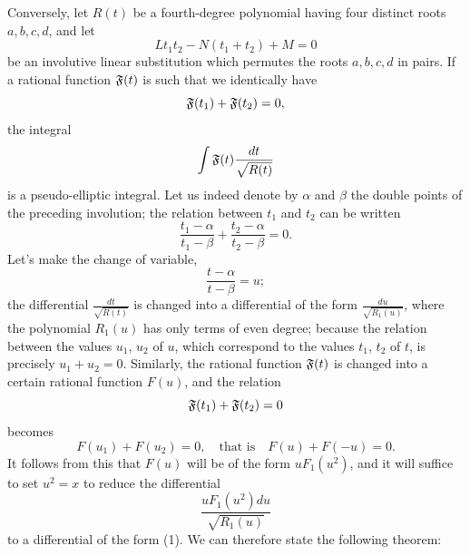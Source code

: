 \documentclass[11pt]{article}
\begin{document}
Conversely, let $R(t)$ be a fourth-degree polynomial having four distinct roots $a, b, c, d$, and let
\begin{equation*}
Lt_{1}t_{2}-N(t_{1}+t_{2})+M=0
\end{equation*}
be an involutive linear substitution which permutes the roots $a, b, c, d$ in pairs. If a rational function $\mathfrak{F}(t)$ is such that we identically have
\begin{equation*}
\mathfrak{F}(t_{1})+\mathfrak{F}(t_{2})=0,
\end{equation*}
the integral
\begin{equation*}
\int\mathfrak{F}(t)\frac{dt}{\sqrt{R(t)}}
\end{equation*}
is a pseudo-elliptic integral. Let us indeed denote by $\alpha$ and $\beta$ the double points of the preceding involution; the relation between $t_1$ and $t_2$ can be written
\begin{equation*}
\frac{t_{1}-\alpha}{t_{1}-\beta}+\frac{t_{2}-\alpha}{t_{2}-\beta}=0.
\end{equation*}
Let's make the change of variable,
\begin{equation*}
\frac{t-\alpha}{t-\beta}=u;
\end{equation*}
the differential $\frac{dt}{\sqrt{R(t)}}$ is changed into a differential of the form $\frac{du}{\sqrt{R_{1}(u)}}$, where the polynomial $R_{1}(u)$ has only terms of even degree; because the relation between the values $u_{1}$, $u_{2}$ of $u$, which correspond to the values $t_{1}$, $t_{2}$ of $t$, is precisely $u_{1}+u_{2}=0$. Similarly, the rational function $\mathfrak{F}(t)$ is changed into a certain rational function $F(u)$, and the relation
\begin{equation*}
\mathfrak{F}(t_{1})+\mathfrak{F}(t_{2})=0
\end{equation*}
becomes
\begin{equation*}
F(u_{1})+F(u_{2})=0, \quad \text{that is} \quad F(u)+F(-u)=0.
\end{equation*}
It follows from this that $F(u)$ will be of the form $uF_{1}(u^{2})$, and it will suffice to set $u^{2}=x$ to reduce the differential
\begin{equation*}
\frac{u F_{1}(u^{2})du}{\sqrt{R_{1}(u)}}
\end{equation*}
to a differential of the form (1). We can therefore state the following theorem:
\end{document}
